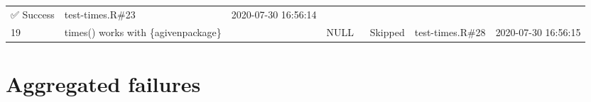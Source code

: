 \documentclass[
]{book}
\begin{document}
\begin{longtable}[]{@{}lllllll@{}}
\begin{minipage}[t]{0.22\columnwidth}
✅ Success\strut
\end{minipage} & \begin{minipage}[t]{0.06\columnwidth}\raggedright
test-times.R\#23\strut
\end{minipage} & \begin{minipage}[t]{0.08\columnwidth}\raggedright
2020-07-30 16:56:14\strut
\end{minipage}\tabularnewline
\begin{minipage}[t]{0.01\columnwidth}\raggedright
19\strut
\end{minipage} & \begin{minipage}[t]{0.14\columnwidth}\raggedright
times() works with \{agivenpackage\}\strut
\end{minipage} & \begin{minipage}[t]{0.25\columnwidth}\raggedright
\strut
\end{minipage} & \begin{minipage}[t]{0.05\columnwidth}\raggedright
NULL\strut
\end{minipage} & \begin{minipage}[t]{0.22\columnwidth}\raggedright
🔄 Skipped\strut
\end{minipage} & \begin{minipage}[t]{0.06\columnwidth}\raggedright
test-times.R\#28\strut
\end{minipage} & \begin{minipage}[t]{0.08\columnwidth}\raggedright
2020-07-30 16:56:15\strut
\end{minipage}\tabularnewline
\bottomrule
\end{longtable}

\hypertarget{aggregated-failures}{%
\chapter{Aggregated failures}\label{aggregated-failures}}
\end{document}
